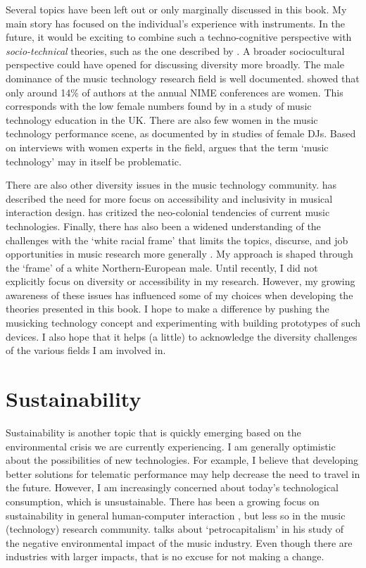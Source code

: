 Several topics have been left out or only marginally discussed in this book. My main story has focused on the individual's experience with instruments. In the future, it would be exciting to combine such a techno-cognitive perspective with \emph{socio-technical} theories, such as the one described by \citet{bijker_bicycles_1997}. A broader sociocultural perspective could have opened for discussing diversity more broadly. The male dominance of the music technology research field is well documented. \citet{xambo_who_2018} showed that only around 14\% of authors at the annual NIME conferences are women. This corresponds with the low female numbers found by \citet{born_music_2015} in a study of music technology education in the UK.
There are also few women in the music technology performance scene, as documented by \citet{gadir_forty-seven_2017} in studies of female DJs. Based on interviews with women experts in the field, \citet{jawad_how_2020} argues that the term `music technology' may in itself be problematic.

There are also other diversity issues in the music technology community.
\citet{frid_diverse_2019} has described the need for more focus on accessibility and inclusivity in musical interaction design. \citet{morreale_where_2021} has critized the neo-colonial tendencies of current music technologies. Finally, there has also been a widened understanding of the challenges with the `white racial frame’ that limits the topics, discurse, and job opportunities in music research more generally \citep{ewell_music_2020}. My approach is shaped through the `frame' of a white Northern-European male. Until recently, I did not explicitly focus on diversity or accessibility in my research. However, my growing awareness of these issues has influenced some of my choices when developing the theories presented in this book. I hope to make a difference by pushing the musicking technology concept and experimenting with building prototypes of such devices. I also hope that it helps (a little) to acknowledge the diversity challenges of the various fields I am involved in.


\section{Sustainability}

Sustainability is another topic that is quickly emerging based on the environmental crisis we are currently experiencing. I am generally optimistic about the possibilities of new technologies. For example, I believe that developing better solutions for telematic performance may help decrease the need to travel in the future. However, I am increasingly concerned about today's technological consumption, which is unsustainable. There has been a growing focus on sustainability in general human-computer interaction \citep{hazas_digital_2017, chapman_emotionally_2015}, but less so in the music (technology) research community. \citet{devine_decomposed_2019} talks about `petrocapitalism' in his study of the negative environmental impact of the music industry. Even though there are industries with larger impacts, that is no excuse for not making a change.

